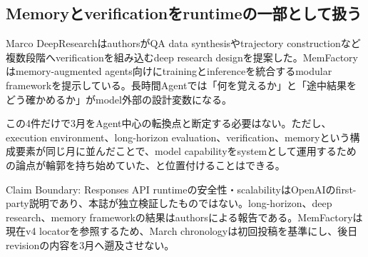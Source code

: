 \subsection{Memoryとverificationをruntimeの一部として扱う}

Marco DeepResearchはauthorsがQA data synthesisやtrajectory constructionなど複数段階へverificationを組み込むdeep research designを提案した。MemFactoryはmemory-augmented agents向けにtrainingとinferenceを統合するmodular frameworkを提示している。長時間Agentでは「何を覚えるか」と「途中結果をどう確かめるか」がmodel外部の設計変数になる。\autocite{src-2b8b39e5cae3,src-42318ebdee75}


この4件だけで3月をAgent中心の転換点と断定する必要はない。ただし、execution environment、long-horizon evaluation、verification、memoryという構成要素が同じ月に並んだことで、model capabilityをsystemとして運用するための論点が輪郭を持ち始めていた、と位置付けることはできる。\autocite{src-01572b4c34e9,src-0ec537ec1cc1,src-2b8b39e5cae3,src-42318ebdee75}


\begin{claimboundary}
Claim Boundary: Responses API runtimeの安全性・scalabilityはOpenAIのfirst-party説明であり、本誌が独立検証したものではない。long-horizon、deep research、memory frameworkの結果はauthorsによる報告である。MemFactoryは現在v4 locatorを参照するため、March chronologyは初回投稿を基準にし、後日revisionの内容を3月へ遡及させない。\autocite{src-01572b4c34e9,src-0ec537ec1cc1,src-2b8b39e5cae3,src-42318ebdee75}
\end{claimboundary}
